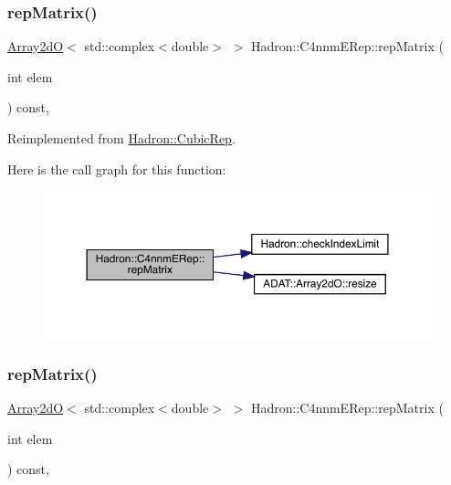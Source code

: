 \subsubsection{\texorpdfstring{repMatrix()}{repMatrix()}\hspace{0.1cm}{\footnotesize\ttfamily [1/3]}}
{\footnotesize\ttfamily \mbox{\hyperlink{classADAT_1_1Array2dO}{Array2dO}}$<$ std\+::complex$<$double$>$ $>$ Hadron\+::\+C4nnm\+E\+Rep\+::rep\+Matrix (\begin{DoxyParamCaption}\item[{int}]{elem }\end{DoxyParamCaption}) const\hspace{0.3cm}{\ttfamily [inline]}, {\ttfamily [virtual]}}



Reimplemented from \mbox{\hyperlink{structHadron_1_1CubicRep_ac5d7e9e6f4ab1158b5fce3e4ad9e8005}{Hadron\+::\+Cubic\+Rep}}.

Here is the call graph for this function\+:
\nopagebreak
\begin{figure}[H]
\begin{center}
\leavevmode
\includegraphics[width=350pt]{dc/d30/structHadron_1_1C4nnmERep_adb5804895fb825dd5a5fde9c417e5cb8_cgraph}
\end{center}
\end{figure}
\mbox{\label{structHadron_1_1C4nnmERep_adb5804895fb825dd5a5fde9c417e5cb8}} 
\subsubsection{\texorpdfstring{repMatrix()}{repMatrix()}\hspace{0.1cm}{\footnotesize\ttfamily [2/3]}}
{\footnotesize\ttfamily \mbox{\hyperlink{classADAT_1_1Array2dO}{Array2dO}}$<$ std\+::complex$<$double$>$ $>$ Hadron\+::\+C4nnm\+E\+Rep\+::rep\+Matrix (\begin{DoxyParamCaption}\item[{int}]{elem }\end{DoxyParamCaption}) const\hspace{0.3cm}{\ttfamily [inline]}, {\ttfamily [virtual]}}




